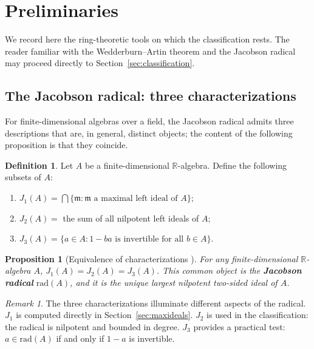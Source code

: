 \documentclass{amsart}
\theoremstyle{plain}
\newtheorem{proposition}[theorem]{Proposition}
\theoremstyle{definition}
\newtheorem{definition}[theorem]{Definition}
\theoremstyle{remark}
\newtheorem{remark}[theorem]{Remark}
\newcommand{\RR}{\mathbb{R}}
\newcommand{\Jac}{\mathrm{rad}}
\begin{document}
\section{Preliminaries}\label{sec:prelim}

We record here the ring-theoretic tools on which the classification rests.
The reader familiar with the Wedderburn--Artin theorem and the Jacobson
radical may proceed directly to Section~\ref{sec:classification}.

\subsection{The Jacobson radical: three characterizations}

For finite-dimensional algebras over a field, the Jacobson radical admits
three descriptions that are, in general, distinct objects; the content of
the following proposition is that they coincide.

\begin{definition}\label{def:jac}
  Let $A$ be a finite-dimensional $\RR$-algebra.
  Define the following subsets of $A$:
  \begin{enumerate}[label=\textup{(\alph*)}]
    \item $J_1(A) = \bigcap \{\mathfrak{m} : \mathfrak{m}
          \text{ a maximal left ideal of } A\}$;
    \item $J_2(A) = $ the sum of all nilpotent left ideals of $A$;
    \item $J_3(A) = \{a \in A : 1 - ba \text{ is invertible for all }
          b \in A\}$.
  \end{enumerate}
\end{definition}

\begin{proposition}[Equivalence of characterizations {\cite{Pierce1982}}]
  \label{prop:jaceq}
  For any finite-dimensional $\RR$-algebra $A$,
  $J_1(A) = J_2(A) = J_3(A)$.
  This common object is the \textbf{Jacobson radical} $\Jac(A)$,
  and it is the unique largest nilpotent two-sided ideal of $A$.
\end{proposition}

\begin{remark}
  The three characterizations illuminate different aspects of the radical.
  $J_1$ is computed directly in Section~\ref{sec:maxideals}.
  $J_2$ is used in the classification: the radical is nilpotent and
  bounded in degree.
  $J_3$ provides a practical test: $a \in \Jac(A)$ if and only if
  $1 - a$ is invertible.
\end{remark}
\end{document}
